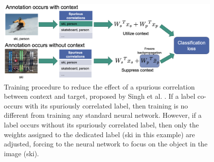\documentclass{article}
\begin{document}
\begin{figure}
    \centering
    \includegraphics[scale=0.44]{context_suppression.png}
    \caption{Training procedure to reduce the effect of a spurious correlation between context and target, proposed
    by Singh et al. \cite{Singh_2020_CVPR}. If a label co-occurs with its spuriously correlated label, then training is
    no different from training any standard neural network. However, if a label occurs without its spuriously correlated
    label, then only the weights assigned to the dedicated label (ski in this example) are adjusted, forcing to the neural
    network to focus on the object in the image (ski).}
    \label{fig:contextSupprImg}
\end{figure}
\end{document}
